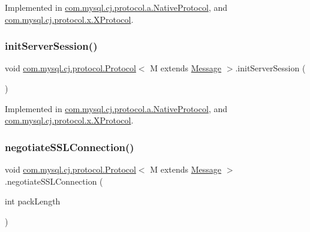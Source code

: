 Implemented in \mbox{\hyperlink{classcom_1_1mysql_1_1cj_1_1protocol_1_1a_1_1_native_protocol_a78d72401af5414a2271b9f1012b8a2f9}{com.\+mysql.\+cj.\+protocol.\+a.\+Native\+Protocol}}, and \mbox{\hyperlink{classcom_1_1mysql_1_1cj_1_1protocol_1_1x_1_1_x_protocol_a4007f4bf0c11af18162121e030183839}{com.\+mysql.\+cj.\+protocol.\+x.\+X\+Protocol}}.

\mbox{\label{interfacecom_1_1mysql_1_1cj_1_1protocol_1_1_protocol_ab0e2c37f1f3ab785fee8c60abd7f9e9a}} 
\subsubsection{\texorpdfstring{init\+Server\+Session()}{initServerSession()}}
{\footnotesize\ttfamily void \mbox{\hyperlink{interfacecom_1_1mysql_1_1cj_1_1protocol_1_1_protocol}{com.\+mysql.\+cj.\+protocol.\+Protocol}}$<$ M extends \mbox{\hyperlink{interfacecom_1_1mysql_1_1cj_1_1protocol_1_1_message}{Message}} $>$.init\+Server\+Session (\begin{DoxyParamCaption}{ }\end{DoxyParamCaption})}



Implemented in \mbox{\hyperlink{classcom_1_1mysql_1_1cj_1_1protocol_1_1a_1_1_native_protocol_a61e852702d328b23aa56145df3608e51}{com.\+mysql.\+cj.\+protocol.\+a.\+Native\+Protocol}}, and \mbox{\hyperlink{classcom_1_1mysql_1_1cj_1_1protocol_1_1x_1_1_x_protocol_ae032f87fdc528d7fd0bfe0f4c7c96767}{com.\+mysql.\+cj.\+protocol.\+x.\+X\+Protocol}}.

\mbox{\label{interfacecom_1_1mysql_1_1cj_1_1protocol_1_1_protocol_adb74cf66c1d6f69ff114d3d6c45db6dd}} 
\subsubsection{\texorpdfstring{negotiate\+S\+S\+L\+Connection()}{negotiateSSLConnection()}}
{\footnotesize\ttfamily void \mbox{\hyperlink{interfacecom_1_1mysql_1_1cj_1_1protocol_1_1_protocol}{com.\+mysql.\+cj.\+protocol.\+Protocol}}$<$ M extends \mbox{\hyperlink{interfacecom_1_1mysql_1_1cj_1_1protocol_1_1_message}{Message}} $>$.negotiate\+S\+S\+L\+Connection (\begin{DoxyParamCaption}\item[{int}]{pack\+Length }\end{DoxyParamCaption})}



